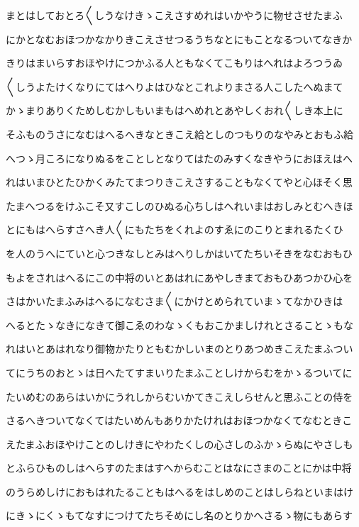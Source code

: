 \documentclass[a4paper,11pt,landscape]{ltjtarticle}
\begin{document}
まとはしておとろ〱しうなけきゝこえさすめれはいかやうに物せさせたまふ
\par\medskip
にかとなむおほつかなかりきこえさせつるうちなとにもことなるついてなきか
\par\medskip
きりはまいらすおほやけにつかふる人ともなくてこもりはへれはよろつうゐ
\par\medskip
〱しうよたけくなりにてはへりよはひなとこれよりまさる人こしたへぬまて
\par\medskip
かゝまりありくためしむかしもいまもはへめれとあやしくおれ〱しき本上に
\par\medskip
そふものうさになむはへるへきなときこえ給としのつもりのなやみとおもふ給
\par\medskip
へつゝ月ころになりぬるをことしとなりてはたのみすくなきやうにおほえはへ
\par\medskip
れはいまひとたひかくみたてまつりきこえさすることもなくてやと心ほそく思
\par\medskip
たまへつるをけふこそ又すこしのひぬる心ちしはへれいまはおしみとむへきほ
\par\medskip
とにもはへらすさへき人〱にもたちをくれよのすゑにのこりとまれるたくひ
\par\medskip
を人のうへにていと心つきなしとみはへりしかはいてたちいそきをなむおもひ
\par\medskip
もよをされはへるにこの中将のいとあはれにあやしきまておもひあつかひ心を
\par\medskip
さはかいたまふみはへるになむさま〱にかけとめられていまゝてなかひきは
\par\medskip
へるとたゝなきになきて御こゑのわなゝくもおこかましけれとさることゝもな
\par\medskip
れはいとあはれなり御物かたりともむかしいまのとりあつめきこえたまふつい
\par\medskip
てにうちのおとゝは日へたてすまいりたまふことしけからむをかゝるついてに
\par\medskip
たいめむのあらはいかにうれしからむいかてきこえしらせんと思ふことの侍を
\par\medskip
さるへきついてなくてはたいめんもありかたけれはおほつかなくてなむときこ
\par\medskip
えたまふおほやけことのしけきにやわたくしの心さしのふかゝらぬにやさしも
\par\medskip
とふらひものしはへらすのたまはすへからむことはなにさまのことにかは中将
\par\medskip
のうらめしけにおもはれたることもはへるをはしめのことはしらねといまはけ
\par\medskip
にきゝにくゝもてなすにつけてたちそめにし名のとりかへさるゝ物にもあらす
\end{document}
